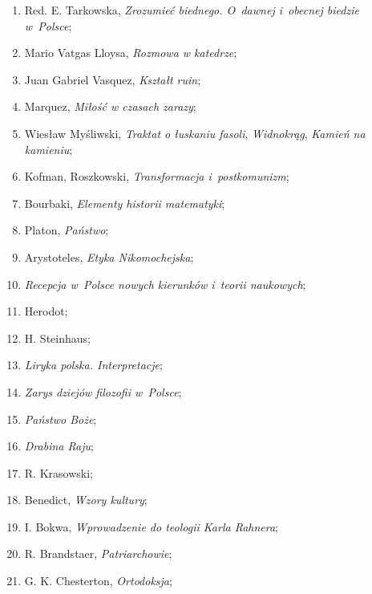 \documentclass[a4paper,11pt]{article}
\begin{document}
\begin{enumerate}
\item Red. E. Tarkowska, \emph{Zrozumieć biednego. O~dawnej i~obecnej
    biedzie w~Polsce};

\item Mario Vatgas Lloysa, \emph{Rozmowa w katedrze};

\item Juan Gabriel Vasquez, \emph{Kształt ruin};

\item Marquez, \emph{Miłość w czasach zarazy};

\item Wiesław Myśliwski, \emph{Traktat o łuskaniu fasoli},
  \emph{Widnokrąg}, \emph{Kamień na kamieniu};

\item Kofman, Roszkowski, \emph{Transformacja i~postkomunizm};

\item Bourbaki, \emph{Elementy historii matematyki};

\item Platon, \emph{Państwo};

\item Arystoteles, \emph{Etyka Nikomochejska};

\item \emph{Recepcja w~Polsce nowych kierunków i~teorii naukowych};

\item Herodot;

\item H. Steinhaus;

\item \emph{Liryka polska. Interpretacje};

\item \emph{Zarys dziejów filozofii w~Polsce};

\item \emph{Państwo Boże};

\item \emph{Drabina Raju};

\item R. Krasowski;

\item Benedict, \emph{Wzory kultury};

\item I. Bokwa, \emph{Wprowadzenie do teologii Karla Rahnera};

\item R. Brandstaer, \emph{Patriarchowie};

\item G. K. Chesterton, \emph{Ortodoksja};


\end{enumerate}
\end{document}
